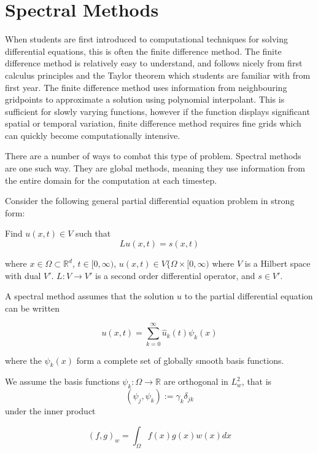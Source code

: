 \chapter{Spectral Methods}

When students are first introduced to computational techniques for solving differential equations, this is often the finite difference method. The finite difference method is relatively easy to understand, and follows nicely from first calculus principles and the Taylor theorem which students are familiar with from first year. The finite difference method uses information from neighbouring gridpoints to approximate a solution using polynomial interpolant. This is sufficient for slowly varying functions, however if the function displays significant spatial or temporal variation, finite difference method requires fine grids which can quickly become computationally intensive.

There are a number of ways to combat this type of problem. Spectral methods are one such way. They are global methods, meaning they use information from the entire domain for the computation at each timestep.

Consider the following general partial differential equation problem in strong form: 

Find $u(x,t)\in V$ such that
\begin{equation} Lu(x,t)=s(x,t) \end{equation}

where $x\in \Omega \subset \mathbb{R}^d$, $t\in [0,\infty)$, $u(x,t) \in V\{\Omega \times [0,\infty)$ where $V$ is a Hilbert space with dual $V'$. $L:V \rightarrow V'$ is a second order differential operator, and $s\in V'$. 

A spectral method assumes that the solution $u$ to the partial differential equation can be written 

\begin{equation} u(x,t) = \sum_{k=0}^\infty \hat{u}_k(t) \psi_k(x) \end{equation}

where the $\psi_k(x)$ form a complete set of globally smooth basis functions. 

We assume the basis functions $\psi_k: \Omega \rightarrow \mathbb{R}$ are orthogonal in $L^2_w$, that is
\begin{equation} (\psi_j, \psi_k) := \gamma_k \delta_{jk} \end{equation}
under the inner product 

\begin{equation} (f,g)_w = \int_{\Omega}f(x)g(x)w(x)dx \end{equation}

